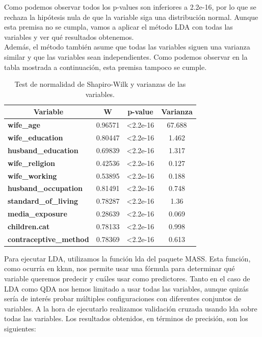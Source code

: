 \documentclass[a4paper,12pt, oneside]{book}
\begin{document}
Como podemos observar todos los p-values son inferiores a 2.2e-16, por lo que se rechaza la hipótesis nula de que la variable siga una distribución normal. Aunque esta premisa no se cumpla, vamos a aplicar el método LDA con todas las variables y ver qué resultados obtenemos.\\

Además, el método también asume que todas las variables siguen una varianza similar y que las variables sean independientes. Como podemos observar en la tabla mostrada a continuación, esta premisa tampoco se cumple.\\

\begin{table}[H]
\centering
\begin{tabular}{@{}lccc@{}}
\toprule
\multicolumn{1}{c}{\textbf{Variable}} & \textbf{W} & \textbf{p-value} & \multicolumn{1}{l}{\textbf{Varianza}} \\ \midrule
\textbf{wife\_age} & 0.96571 & \textless{}2.2e-16 & 67.688 \\
\textbf{wife\_education} & 0.80447 & \textless{}2.2e-16 & 1.462 \\
\textbf{husband\_education} & 0.69839 & \textless{}2.2e-16 & 1.317 \\
\textbf{wife\_religion} & 0.42536 & \textless{}2.2e-16 & 0.127 \\
\textbf{wife\_working} & 0.53895 & \textless{}2.2e-16 & 0.188 \\
\textbf{husband\_occupation} & 0.81491 & \textless{}2.2e-16 & 0.748\\
\textbf{standard\_of\_living} & 0.78287 & \textless{}2.2e-16 & 1.36 \\
\textbf{media\_exposure} & 0.28639 & \textless{}2.2e-16 & 0.069 \\
\textbf{children.cat} & 0.78133 & \textless{}2.2e-16 & 0.998\\
\textbf{contraceptive\_method} & 0.78369 & \textless{}2.2e-16 & 0.613 \\ \bottomrule
\end{tabular}
\caption{Test de normalidad de Shapiro-Wilk y varianzas de las variables.}
\label{tab:shapironormality}
\end{table}

Para ejecutar LDA, utilizamos la función lda del paquete MASS. Esta función, como ocurría en kknn, nos permite usar una fórmula para determinar qué variable queremos predecir y cuáles usar como predictores. Tanto en el caso de LDA como QDA nos hemos limitado a usar todas las variables, aunque quizás sería de interés probar múltiples configuraciones con diferentes conjuntos de variables. A la hora de ejecutarlo realizamos validación cruzada usando lda sobre todas las variables. Los resultados obtenidos, en términos de precisión, son los siguientes: \\
\end{document}
